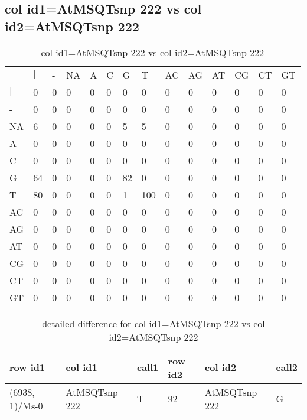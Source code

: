 \subsection{col id1=AtMSQTsnp 222 vs col id2=AtMSQTsnp 222}
\begin{center}
\begin{longtable}{|l|l|l|l|l|l|l|l|l|l|l|l|l|l|}
\caption{col id1=AtMSQTsnp 222 vs col id2=AtMSQTsnp 222} \label{table_dm786}\\
\hline
\\
\hline
&$|$&-&NA&A&C&G&T&AC&AG&AT&CG&CT&GT\\
$|$&0&0&0&0&0&0&0&0&0&0&0&0&0\\
-&0&0&0&0&0&0&0&0&0&0&0&0&0\\
NA&6&0&0&0&0&5&5&0&0&0&0&0&0\\
A&0&0&0&0&0&0&0&0&0&0&0&0&0\\
C&0&0&0&0&0&0&0&0&0&0&0&0&0\\
G&64&0&0&0&0&82&0&0&0&0&0&0&0\\
T&80&0&0&0&0&1&100&0&0&0&0&0&0\\
AC&0&0&0&0&0&0&0&0&0&0&0&0&0\\
AG&0&0&0&0&0&0&0&0&0&0&0&0&0\\
AT&0&0&0&0&0&0&0&0&0&0&0&0&0\\
CG&0&0&0&0&0&0&0&0&0&0&0&0&0\\
CT&0&0&0&0&0&0&0&0&0&0&0&0&0\\
GT&0&0&0&0&0&0&0&0&0&0&0&0&0\\
\hline
\end{longtable}
\end{center}

\begin{center}
\begin{longtable}{|l|l|l|l|l|l|}
\caption{detailed difference for col id1=AtMSQTsnp 222 vs col id2=AtMSQTsnp 222} \label{table_dm787}\\
\hline
row id1&col id1&call1&row id2&col id2&call2\\
\hline
(6938, 1)/Ms-0&AtMSQTsnp 222&T&92&AtMSQTsnp 222&G\\
\hline
\end{longtable}
\end{center}

